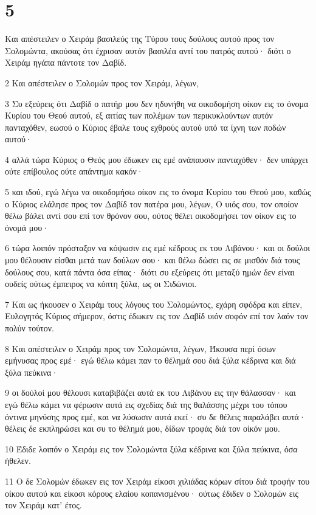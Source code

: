 \chapter{5}

\par Και απέστειλεν ο Χειράμ βασιλεύς της Τύρου τους δούλους αυτού προς τον Σολομώντα, ακούσας ότι έχρισαν αυτόν βασιλέα αντί του πατρός αυτού· διότι ο Χειράμ ηγάπα πάντοτε τον Δαβίδ.
\par 2 Και απέστειλεν ο Σολομών προς τον Χειράμ, λέγων,
\par 3 Συ εξεύρεις ότι Δαβίδ ο πατήρ μου δεν ηδυνήθη να οικοδομήση οίκον εις το όνομα Κυρίου του Θεού αυτού, εξ αιτίας των πολέμων των περικυκλούντων αυτόν πανταχόθεν, εωσού ο Κύριος έβαλε τους εχθρούς αυτού υπό τα ίχνη των ποδών αυτού·
\par 4 αλλά τώρα Κύριος ο Θεός μου έδωκεν εις εμέ ανάπαυσιν πανταχόθεν· δεν υπάρχει ούτε επίβουλος ούτε απάντημα κακόν·
\par 5 και ιδού, εγώ λέγω να οικοδομήσω οίκον εις το όνομα Κυρίου του Θεού μου, καθώς ο Κύριος ελάλησε προς τον Δαβίδ τον πατέρα μου, λέγων, Ο υιός σου, τον οποίον θέλω βάλει αντί σου επί τον θρόνον σου, ούτος θέλει οικοδομήσει τον οίκον εις το όνομά μου·
\par 6 τώρα λοιπόν πρόσταξον να κόψωσιν εις εμέ κέδρους εκ του Λιβάνου· και οι δούλοι μου θέλουσιν είσθαι μετά των δούλων σου· και θέλω δώσει εις σε μισθόν διά τους δούλους σου, κατά πάντα όσα είπας· διότι συ εξεύρεις ότι μεταξύ ημών δεν είναι ουδείς ούτως έμπειρος να κόπτη ξύλα, ως οι Σιδώνιοι.
\par 7 Και ως ήκουσεν ο Χειράμ τους λόγους του Σολομώντος, εχάρη σφόδρα και είπεν, Ευλογητός Κύριος σήμερον, όστις έδωκεν εις τον Δαβίδ υιόν σοφόν επί τον λαόν τον πολύν τούτον.
\par 8 Και απέστειλεν ο Χειράμ προς τον Σολομώντα, λέγων, Ήκουσα περί όσων εμήνυσας προς εμέ· εγώ θέλω κάμει παν το θέλημά σου διά ξύλα κέδρινα και διά ξύλα πεύκινα·
\par 9 οι δούλοί μου θέλουσι καταβιβάζει αυτά εκ του Λιβάνου εις την θάλασσαν· και εγώ θέλω κάμει να φέρωσιν αυτά εις σχεδίας διά της θαλάσσης μέχρι του τόπου όντινα μηνύσης προς εμέ, και να λύσωσιν αυτά εκεί· συ δε θέλεις παραλάβει αυτά· θέλεις δε εκπληρώσει και συ το θέλημά μου, δίδων τροφάς διά τον οίκόν μου.
\par 10 Έδιδε λοιπόν ο Χειράμ εις τον Σολομώντα ξύλα κέδρινα και ξύλα πεύκινα, όσα ήθελεν.
\par 11 Ο δε Σολομών έδωκεν εις τον Χειράμ είκοσι χιλιάδας κόρων σίτου διά τροφήν του οίκου αυτού και είκοσι κόρους ελαίου κοπανισμένου· ούτως έδιδεν ο Σολομών εις τον Χειράμ κατ' έτος.
